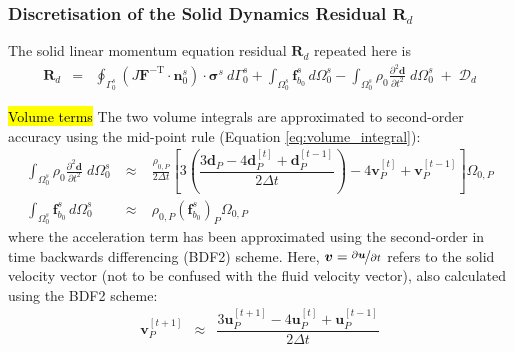 \documentclass[sn-mathphys,Numbered]{sn-jnl}%
\newcommand{\bb}{\boldsymbol}
\begin{document}
\subsubsection[Discretisation of the Solid Dynamics Residual]{Discretisation of the Solid Dynamics Residual $\bb{R}_d$}
The solid linear momentum equation residual $\bb{R}_d$ repeated here is
\begin{eqnarray}
    \bb{R}_d
    &=&
    \oint_{\Gamma_0^s} \left( J \bb{F}^{-\text{T}} \cdot \bb{n}_0^s \right) \cdot \bb{\sigma}^s \ d\Gamma_0^s
    + \int_{\Omega_0^s}  \bb{f}_{b_0}^s \, d\Omega_0^s
    - \int_{\Omega_0^s} \rho_0 \frac{\partial^2 \bb{d} }{\partial t^2} \; d\Omega_0^s
    \;+\; \bb{\mathcal{D}}_d
\end{eqnarray}

\hl{Volume terms}
The two volume integrals are approximated to second-order accuracy using the mid-point rule (Equation \ref{eq:volume_integral}):
\begin{eqnarray}
	\int_{\Omega_0^s} \rho_0 \frac{\partial^2 \bb{d} }{\partial t^2} \; d\Omega_0^s
		\;&\approx&\; \frac{\rho_{0,P}}{2\Delta t}
		\left[
			3\left( 
			\dfrac{3\boldsymbol{d}_P - 4\boldsymbol{d}_P^{[t]} + \boldsymbol{d}_P^{[t-1]}}{2\Delta t} 
			\right) 
			- 4\boldsymbol{v}_P^{[t]} + \boldsymbol{v}_P^{[t-1]}
		\right] \Omega_{0,P} \\
	\int_{\Omega_0^s}  \bb{f}_{b_0}^s \, d\Omega_0^s
		\;&\approx&\;  \rho_{0,P} \left(\bb{f}^s_{b_0}\right)_P \Omega_{0,P}
\end{eqnarray}
where the acceleration term has been approximated using the second-order in time backwards differencing (BDF2) scheme.
Here, $\boldsymbol{v} = \nicefrac{\partial \bb{u}}{\partial t}$ refers to the solid velocity vector (not to be confused with the fluid velocity vector), also calculated using the BDF2 scheme:
 \begin{eqnarray}
	\boldsymbol{v}_P^{[t+1]}	&\approx&
		\dfrac{3\boldsymbol{u}_P^{[t+1]} - 4\boldsymbol{u}_P^{[t]} + \boldsymbol{u}_P^{[t-1]}}{2\Delta t} 
\end{eqnarray}
\end{document}
